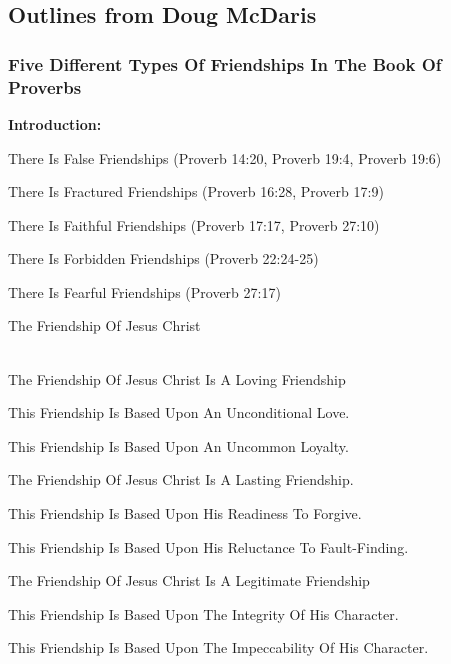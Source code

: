 \subsection{Outlines from Doug McDaris}

\subsubsection{Five Different Types Of Friendships In The Book Of Proverbs}


\noindent  \textbf{Introduction: } 
\begin{compactenum}[A.]
    \item There Is False Friendships (Proverb 14:20, Proverb 19:4, Proverb 19:6)
    \item There Is Fractured  Friendships (Proverb 16:28, Proverb 17:9)
    \item There Is Faithful  Friendships (Proverb 17:17, Proverb 27:10)
    \item There Is Forbidden  Friendships (Proverb 22:24-25)
    \item There Is Fearful Friendships (Proverb 27:17)\\
\end{compactenum}
The Friendship Of Jesus Christ\\
\\
\begin{compactenum}[I.]
    \item The Friendship Of Jesus Christ Is A Loving Friendship
    \begin{compactenum}[A.]
        \item This Friendship Is Based Upon An Unconditional Love.
        \item This Friendship Is Based Upon An Uncommon Loyalty.
    \end{compactenum}
    \item The Friendship Of Jesus Christ Is A Lasting Friendship.
    \begin{compactenum}[A.]
        \item This Friendship Is Based Upon His Readiness To Forgive.
        \item This Friendship Is Based Upon His Reluctance To Fault-Finding.
    \end{compactenum}
    \item The Friendship Of Jesus Christ Is A Legitimate Friendship
    \begin{compactenum}[A.]
        \item This Friendship Is Based Upon The Integrity Of His Character.
        \item This Friendship Is Based Upon The Impeccability Of His Character.
    \end{compactenum}
\end{compactenum}



